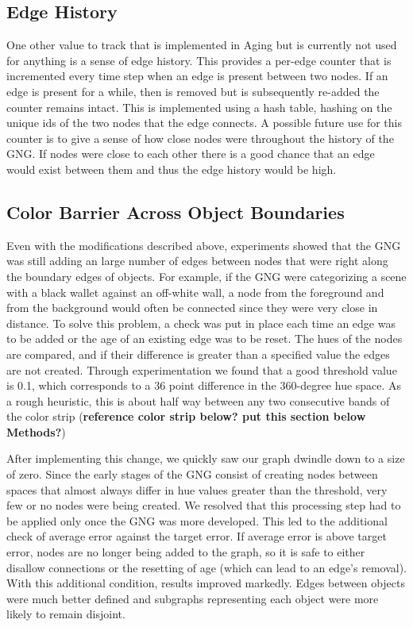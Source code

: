 \documentclass{article}
\renewcommand{\|}{\origbar} %
\begin{document}
\subsection{Edge History}

One other value to track that is implemented in Aging but is currently not used for anything is a sense of edge history. This provides a per-edge counter that is incremented every time step when an edge is present between two nodes. If an edge is present for a while, then is removed but is subsequently re-added the counter remains intact. This is implemented using a hash table, hashing on the unique ids of the two nodes that the edge connects. A possible future use for this counter is to give a sense of how close nodes were throughout the history of the GNG. If nodes were close to each other there is a good chance that an edge would exist between them and thus the edge history would be high.

\subsection{Color Barrier Across Object Boundaries}

Even with the modifications described above, experiments showed that the GNG was still adding an large number of edges between nodes that were right along the boundary edges of objects. For example, if the GNG were categorizing a scene with a black wallet against an off-white wall, a node from the foreground and from the background would often be connected since they were very close in distance. To solve this problem, a check was put in place each time an edge was to be added or the age of an existing edge was to be reset. The hues of the nodes are compared, and if their difference is greater than a specified value the edges are not created. Through experimentation we found that a good threshold value is 0.1, which corresponds to a 36 point difference in the 360-degree hue space. As a rough heuristic, this is about half way between any two consecutive bands of the color strip ({\bf reference color strip below? put this section below Methods?})

After implementing this change, we quickly saw our graph dwindle down to a size of zero. Since the early stages of the GNG consist of creating nodes between spaces that almost always differ in hue values greater than the threshold, very few or no nodes were being created. We resolved that this processing step had to be applied only once the GNG was more developed. This led to the additional check of average error against the target error. If average error is above target error, nodes are no longer being added to the graph, so it is safe to either disallow connections or the resetting of age (which can lead to an edge's removal). With this additional condition, results improved markedly. Edges between objects were much better defined and subgraphs representing each object were more likely to remain disjoint.
\end{document}
